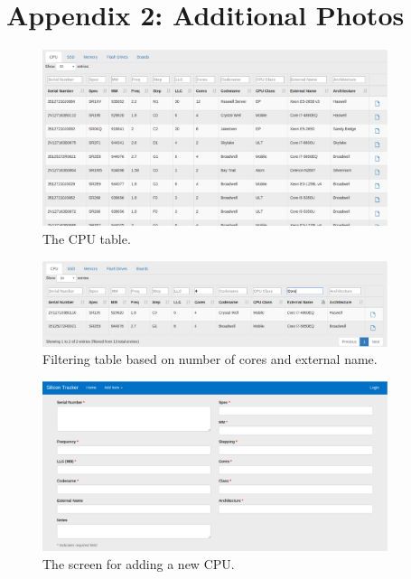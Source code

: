 \documentclass[10pt, onecolumn, twoside, peerreview]{IEEEtran}
\begin{document}
\section{Appendix 2: Additional Photos}
\begin{figure}[!ht]
    \centering
    \captionsetup{justification=centering}
    \includegraphics[width=0.9\textwidth]{img-4.eps}
    \caption{The CPU table.}
\end{figure}

\begin{figure}[!ht]
    \centering
    \captionsetup{justification=centering}
    \includegraphics[width=0.9\textwidth]{img-3.eps}
    \caption{Filtering table based on number of cores and external name.}
\end{figure}

\begin{figure}[!ht]
    \centering
    \captionsetup{justification=centering}
    \includegraphics[width=0.9\textwidth]{img-2.eps}
    \caption{The screen for adding a new CPU.}
\end{figure}
\end{document}
